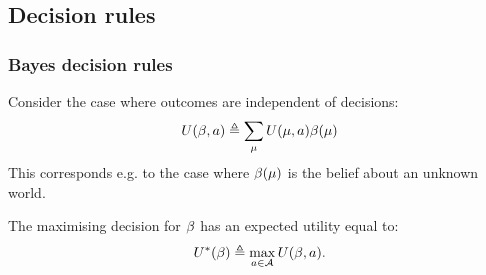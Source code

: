 \subsection{Decision rules}


\begin{frame}
  \frametitle{Bayes decision rules}
  Consider the case where outcomes are independent of decisions:
  \[
  U (\beta, a) \mathrel{\triangleq} \sum_{\mu}  U (\mu, a) \beta(\mu)
  \]
  This corresponds e.g. to the case where $\beta(\mu)$ is the belief about an unknown world.
  \begin{definition}
    \label{def:bayes-utility}
    The maximising decision for $\beta$ has an expected utility equal to:
    \begin{equation}
      U^*(\beta) \mathrel{\triangleq} \max_{a \in \mathcal{A}} U (\beta, a).
      \label{eq:bayes-utility}
    \end{equation}
  \end{definition}
\end{frame}




